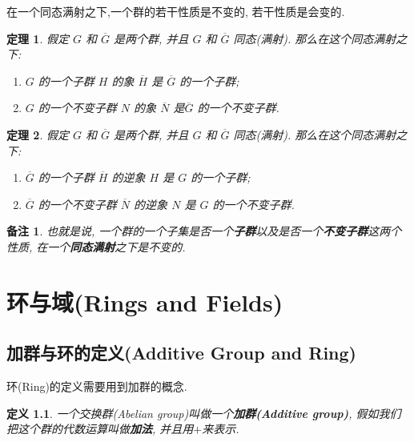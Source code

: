 \documentclass[utf8]{ctexbook}
\newtheorem{theorem}{定理}[section]
\newtheorem{definition}{定义}[section]
\newtheorem{memo}{备注}[section]
\begin{document}
在一个同态满射之下,一个群的若干性质是不变的, 若干性质是会变的.


\begin{theorem}\label{theorem_subgroup_image_homomorphism_invariance}
假定 $G$ 和 $\overline{G}$ 是两个群, 并且 $G$ 和 $\overline{G}$ 同态(满射). 那么在这个同态满射之下:
\begin{enumerate}
\item{$G$ 的一个子群 $H$ 的象 $\overline{H}$ 是 $\overline{G}$ 的一个子群;}
\item{$G$ 的一个不变子群 $N$ 的象 $\overline{N}$ 是$\overline{G}$ 的一个不变子群.}
\end{enumerate}

\end{theorem}

\begin{theorem}\label{theorem_subgroup_preimage_homomorphism_invariance}
假定 $G$ 和 $\overline{G}$ 是两个群, 并且 $G$ 和 $\overline{G}$ 同态(满射). 那么在这个同态满射之下:
\begin{enumerate}
\item{$\overline{G}$ 的一个子群 $\overline{H}$ 的逆象 $H$ 是 $G$ 的一个子群;}
\item{$\overline{G}$ 的一个不变子群 $\overline{N}$ 的逆象 $N$ 是 $G$ 的一个不变子群.}
\end{enumerate}

\end{theorem}

\begin{memo}

也就是说, 一个群的一个子集是否一个\textbf{子群}以及是否一个\textbf{不变子群}这两个性质, 在一个\textbf{同态满射}之下是不变的.
\end{memo}


\chapter{环与域(Rings and Fields)}

\section{加群与环的定义(Additive Group and Ring)}

环(Ring)的定义需要用到加群的概念.

\begin{definition}
一个交换群(Abelian group)叫做一个\textbf{加群(Additive group)}, 假如我们把这个群的代数运算叫做\textbf{加法}, 并且用$+$来表示.
\end{definition}
\end{document}
